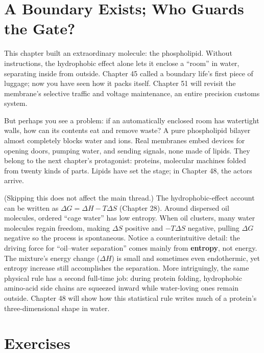 \section{A Boundary Exists; Who Guards the Gate?}

This chapter built an extraordinary molecule: the phospholipid. Without instructions, the hydrophobic effect alone lets it enclose a ``room'' in water, separating inside from outside. Chapter 45 called a boundary life's first piece of luggage; now you have seen how it packs itself. Chapter 51 will revisit the membrane's selective traffic and voltage maintenance, an entire precision customs system.

But perhaps you see a problem: if an automatically enclosed room has watertight walls, how can its contents eat and remove waste? A pure phospholipid bilayer almost completely blocks water and ions. Real membranes embed devices for opening doors, pumping water, and sending signals, none made of lipids. They belong to the next chapter's protagonist: proteins, molecular machines folded from twenty kinds of parts. Lipids have set the stage; in Chapter 48, the actors arrive.

\begin{tiaozhan}
(Skipping this does not affect the main thread.) The hydrophobic-effect account can be written as $\Delta G = \Delta H - T\Delta S$ (Chapter 28). Around dispersed oil molecules, ordered ``cage water'' has low entropy. When oil clusters, many water molecules regain freedom, making $\Delta S$ positive and $-T\Delta S$ negative, pulling $\Delta G$ negative so the process is spontaneous. Notice a counterintuitive detail: the driving force for ``oil--water separation'' comes mainly from \textbf{entropy}, not energy. The mixture's energy change ($\Delta H$) is small and sometimes even endothermic, yet entropy increase still accomplishes the separation. More intriguingly, the same physical rule has a second full-time job: during protein folding, hydrophobic amino-acid side chains are squeezed inward while water-loving ones remain outside. Chapter 48 will show how this statistical rule writes much of a protein's three-dimensional shape in water.
\end{tiaozhan}

\section*{Exercises}

